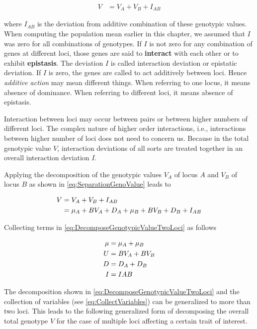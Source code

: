 \documentclass[
]{book}
\theoremstyle{definition}
\theoremstyle{definition}
\theoremstyle{definition}
\theoremstyle{remark}
\begin{document}
\begin{align}
V &= V_A + V_B + I_{AB} 
\label{eq:AggregateGenotypicValueTwoLoci}
\end{align}

where \(I_{AB}\) is the deviation from additive combination of these genotypic values. When computing the population mean earlier in this chapter, we assumed that \(I\) was zero for all combinations of genotypes. If \(I\) is not zero for any combination of genes at different loci, those genes are said to \textbf{interact} with each other or to exhibit \textbf{epistasis}. The deviation \(I\) is called interaction deviation or epistatic deviation. If \(I\) is zero, the genes are called to act additively between loci. Hence \emph{additive action} may mean different things. When referring to one locus, it means absence of dominance. When referring to different loci, it means absence of epistasis.

Interaction between loci may occur between pairs or between higher numbers of different loci. The complex nature of higher order interactions, i.e., interactions between higher number of loci does not need to concern us. Because in the total genotypic value \(V\), interaction deviations of all sorts are treated together in an overall interaction deviation \(I\).

Applying the decomposition of the genotypic values \(V_A\) of locus \(A\) and \(V_B\) of locus \(B\) as shown in \eqref{eq:SeparationGenoValue} leads to

\begin{align}
V &= V_A + V_B + I_{AB} \notag \\
  &= \mu_A + BV_A + D_A + \mu_B + BV_B + D_B + I_{AB}
\label{eq:DecomposeGenotypicValueTwoLoci}
\end{align}

Collecting terms in \eqref{eq:DecomposeGenotypicValueTwoLoci} as follows

\begin{align}
\mu &= \mu_A + \mu_B \notag \\
U   &= BV_A + BV_B \notag \\
D   &= D_A + D_B \notag \\
I   &= I{AB}
\label{eq:CollectVariables}
\end{align}

The decomposition shown in \eqref{eq:DecomposeGenotypicValueTwoLoci} and the collection of variables (see \eqref{eq:CollectVariables}) can be generalized to more than two loci. This leads to the following generalized form of decomposing the overall total genotype \(V\) for the case of multiple loci affecting a certain trait of interest.
\end{document}

